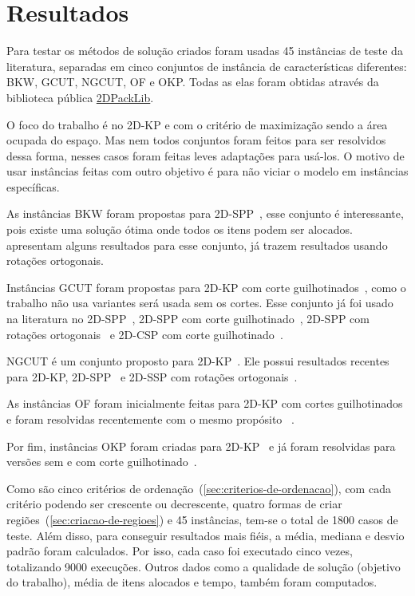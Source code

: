 \chapter{Resultados}\label{ch:resultados}

Para testar os métodos de solução criados foram usadas 45 instâncias de teste da literatura,
separadas em cinco conjuntos de instância de características diferentes:
BKW, GCUT, NGCUT, OF e OKP\@.
Todas as elas foram obtidas através da biblioteca pública
\href{https://site.unibo.it/operations-research/en/research/2dpacklib}{2DPackLib}.

O foco do trabalho é no 2D-KP e com o critério de maximização sendo a área ocupada do espaço.
Mas nem todos conjuntos foram feitos para ser resolvidos dessa forma, nesses casos foram
feitas leves adaptações para usá-los.
O motivo de usar instâncias feitas com outro objetivo é para não viciar o modelo em instâncias
específicas.

As instâncias BKW foram propostas para 2D-SPP~\cite{burke2004new}, esse conjunto é interessante, pois
existe uma solução ótima onde todos os itens podem ser alocados.
\citeauthor*{cote2014combinatorial} apresentam alguns resultados para esse conjunto, já
\citeauthor*{delorme2017logic} trazem resultados usando rotações ortogonais.

Instâncias GCUT foram propostas para 2D-KP com corte guilhotinados~\cite{beasley1985algorithms},
como o trabalho não usa variantes será usada sem os cortes.
Esse conjunto já foi usado na literatura no 2D-SPP~\cite{cote2014combinatorial},
2D-SPP com corte guilhotinado~\cite{mrad2015arc}, 2D-SPP com rotações ortogonais~\cite{delorme2017logic}
e 2D-CSP com corte guilhotinado~\cite{cintra2008algorithms}.

NGCUT é um conjunto proposto para 2D-KP~\cite{beasley1985exact}.
Ele possui resultados recentes para 2D-KP, 2D-SPP~\cite{cote2014combinatorial} e 2D-SSP com
rotações ortogonais~\cite{delorme2017logic}.

As instâncias OF foram inicialmente feitas para 2D-KP com cortes
guilhotinados~\cite{oliveira1990improved} e foram resolvidas recentemente com o mesmo propósito
~\cite{velasco2019improved, martin2020models}.

Por fim, instâncias OKP foram criadas para 2D-KP~\cite{fekete1997new} e já foram resolvidas para
versões sem e com corte guilhotinado~\cite{furini2016modeling}.

Como são cinco critérios de ordenação~(\cref{sec:criterios-de-ordenacao}), com cada critério
podendo ser crescente ou decrescente, quatro formas de criar regiões~(\cref{sec:criacao-de-regioes})
e 45 instâncias, tem-se o total de 1800 casos de teste.
Além disso, para conseguir resultados mais fiéis, a média, mediana e desvio padrão foram calculados.
Por isso, cada caso foi executado cinco vezes, totalizando 9000 execuções.
Outros dados como a qualidade de solução (objetivo do trabalho), média de itens alocados e tempo,
também foram computados.

